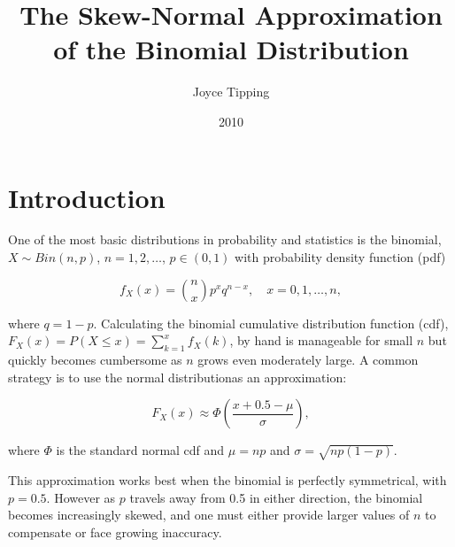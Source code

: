 \title{The Skew-Normal Approximation of the Binomial Distribution}
\author{Joyce Tipping}
\date{2010}
\maketitle

\section{Introduction}

One of the most basic distributions in probability and statistics is the
binomial, $X \sim Bin(n,p)$, $n = 1, 2, \ldots$, $p \in (0, 1)$ with
probability density function (pdf)

\begin{equation*}
  f_X(x) = \binom{n}{x} p^x q^{n-x}, \quad x = 0, 1, \ldots, n,
\end{equation*}

where $q=1-p$. Calculating the binomial cumulative distribution function (cdf),
$F_X(x) = P(X \leq x) = \sum_{k=1}^x f_X(k)$, by hand is manageable for small
$n$ but quickly becomes cumbersome as $n$ grows even moderately large. A common
strategy is to use the normal distribution\footnotemark as an approximation:


\begin{equation}
  F_X(x) \approx \Phi \left( \frac{x + 0.5 - \mu}{\sigma} \right),
\end{equation}

where $\Phi$ is the standard normal cdf and $\mu = np$ and $\sigma =
\sqrt{np(1-p)}$.

This approximation works best when the binomial is perfectly symmetrical, with
$p=0.5$. However as $p$ travels away from 0.5 in either direction, the binomial
becomes increasingly skewed, and one must either provide larger values of $n$
to compensate or face growing inaccuracy.

